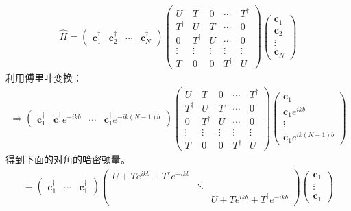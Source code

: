 \documentclass[supercite]{HustGraduPaper}
\begin{document}
\begin{equation}
\begin{split}\hat{H}=\begin{pmatrix}\mathbf{c}_1^\dagger&\mathbf{c}_2^\dagger&\cdots&\mathbf{c}_N^\dagger \end{pmatrix}
\begin{pmatrix} U & T &0 & \cdots&T^\dagger\\
T^\dagger &U&T&\cdots&0\\
0&T^\dagger&U&\cdots&0\\
\vdots&\vdots&\vdots&\vdots&\vdots\\
T&0&0&T^\dagger&U
\end{pmatrix}
\begin{pmatrix}\mathbf{c}_1\\\mathbf{c}_2\\\vdots\\\mathbf{c}_N\end{pmatrix}\end{split}
\end{equation}
利用傅里叶变换：
\begin{equation}
\begin{split}\Rightarrow \begin{pmatrix}\mathbf{c}_1^\dagger&\mathbf{c}_1^\dagger e^{-ikb}&\cdots&\mathbf{c}_1^\dagger e^{-ik(N-1)b} \end{pmatrix}
\begin{pmatrix} U & T &0 & \cdots&T^\dagger\\
T^\dagger &U&T&\cdots&0\\
0&T^\dagger&U&\cdots&0\\
\vdots&\vdots&\vdots&\vdots&\vdots\\
T&0&0&T^\dagger&U
\end{pmatrix}
\begin{pmatrix}\mathbf{c}_1\\\mathbf{c}_1 e^{ikb}\\\vdots\\\mathbf{c}_1e^{ik(N-1)b}\end{pmatrix}\end{split}
\end{equation}
得到下面的对角的哈密顿量。
\begin{equation}
\begin{split}=\begin{pmatrix}\mathbf{c}_1^\dagger&\cdots&\mathbf{c}_1^\dagger \end{pmatrix}
\begin{pmatrix} U+Te^{ikb}+T^\dagger e^{-ikb} & &\\
&\ddots&\\
&&U+Te^{ikb}+T^\dagger e^{-ikb}
\end{pmatrix}
\begin{pmatrix}\mathbf{c}_1\\\vdots\\\mathbf{c}_1\end{pmatrix}\end{split}
\end{equation}
\end{document}
